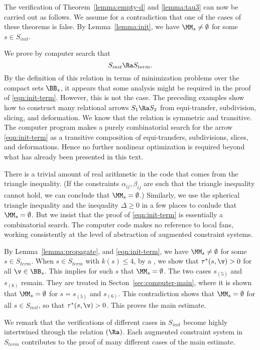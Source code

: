 \begin{remark}
The verification of 
Theorem~\ref{lemma:empty-d} and \ref{lemma:tau3} can now be
carried out as follows.  We assume for a contradiction that
one of the cases of these theorems is false.  By Lemma~\ref{lemma:init}, we have
$\MM_s\ne\emptyset$ for some $s\in S_{init}$.  

We prove by computer search
 that 
\begin{equation}\label{eqn:init-term}
S_{init}\Ra S_{term}.
\end{equation}
   By the definition of this
relation in terms of minimization problems over the compact sets
$\BB_s$,
it appears that some analysis might be required in the proof
of \eqref{eqn:init-term}.  However, this is not the case.  The
preceding
examples show how to construct many relational arrows $S_1\Ra S_2$
from equi-transfer, subdivision, slicing, and deformation.
We know that the relation is symmetric and transitive.   The computer
program makes a purely combinatorial search for the arrow
\eqref{eqn:init-term}
as a transitive composition of equi-transfers, subdivisions, slices,
and
deformations.  Hence no further nonlinear optimization is required
beyond
what has already been presented in this text.

There is a trivial amount of real arithmetic in the code that comes
from the triangle inequality.   (If
the constraints $\alpha_{ij},\beta_{ij}$ are such that the triangle
inequality cannot hold, we can conclude that $\MM_s=\emptyset$.)
Similarly, we use the spherical triangle inequality and the inequality
$\Delta\ge0$ in a few places to conlude that $\MM_s=\emptyset$.
But we insist that the proof of \eqref{eqn:init-term} is essentially
a combinatorial search.  The computer code makes no reference
to local fans, working consistently at the level of abstraction of augmented
constraint
systems.


By Lemma~\ref{lemma:propagate}, and \eqref{eqn:init-term}, we have
$\MM_s\ne\emptyset$ for some $s\in S_{term}$.  When $s\in S_{term}$
with $k(s)\le 4$, by a , we show
that $\tau^*(s,\v) >0$ for all $\v\in \BB_s$.  This implies for such $s$
that $\MM_s=\emptyset$.  The two cases $s_{(5)}$ and $s_{(6)}$ remain.
They are treated in Secton~\ref{sec:computer-main}, where it is shown
that $\MM_s=\emptyset$ for $ s=s_{(5)}$ and $s_{(6)}$.  This
contradiction shows that $\MM_s=\emptyset$ for all $s\in S_{init}$,
so that $\tau^*(s,\v)>0$.  This proves the main estimate.

We remark that the verifications of  different cases in $S_{init}$ become
highly intertwined through the relation $(\Ra)$.  Each augmented
constraint
system in $S_{term}$ contributes to the proof of many different cases
of the main estimate.
\end{remark}